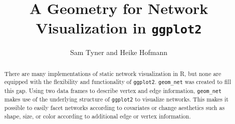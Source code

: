 \documentclass[11pt]{article}
\title{A Geometry for Network Visualization in \MakeLowercase{\texttt{ggplot2}}}
\author{Sam Tyner and Heike Hofmann}
\date{} %
\begin{document}
\maketitle
\begin{abstract}
There are many implementations of static network visualization in R, but none are equipped with the flexibility and functionality of \texttt{ggplot2}.  \texttt{geom\_net} was created to fill this gap. Using two data frames to describe vertex and edge information, \texttt{geom\_net} makes use of the underlying structure of \texttt{ggplot2} to visualize networks. This makes it possible to easily facet networks according to covariates  or change aesthetics such as shape, size, or color according to additional edge or vertex information.
\end{abstract}
\end{document}
